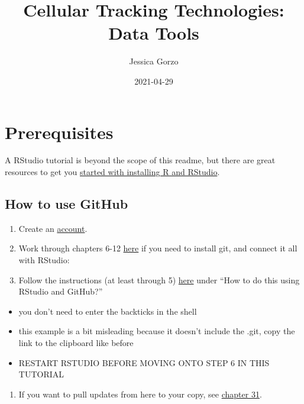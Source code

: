 \documentclass[
]{book}
\title{Cellular Tracking Technologies: Data Tools}
\author{Jessica Gorzo}
\date{2021-04-29}
\providecommand{\tightlist}{%
  \setlength{\itemsep}{0pt}\setlength{\parskip}{0pt}}
\begin{document}
\maketitle

{
\setcounter{tocdepth}{1}
\tableofcontents
}
\hypertarget{prerequisites}{%
\chapter{Prerequisites}\label{prerequisites}}

A RStudio tutorial is beyond the scope of this readme, but there are great resources to get you \href{https://www.earthdatascience.org/courses/earth-analytics/document-your-science/setup-r-rstudio/}{started with installing R and RStudio}.

\hypertarget{how-to-use-github}{%
\section{How to use GitHub}\label{how-to-use-github}}

\begin{enumerate}
\def\labelenumi{\arabic{enumi}.}
\tightlist
\item
  Create an \href{https://github.com}{account}.
\item
  Work through chapters 6-12 \href{https://happygitwithr.com/install-git.html}{here} if you need to install git, and connect it all with RStudio:
\item
  Follow the instructions (at least through 5) \href{https://r-bio.github.io/intro-git-rstudio/}{here} under ``How to do this using RStudio and GitHub?''
\end{enumerate}

\begin{itemize}
\tightlist
\item
  you don't need to enter the backticks in the shell
\item
  this example is a bit misleading because it doesn't include the .git, copy the link to the clipboard like before
\item
  RESTART RSTUDIO BEFORE MOVING ONTO STEP 6 IN THIS TUTORIAL
\end{itemize}

\begin{enumerate}
\def\labelenumi{\arabic{enumi}.}
\setcounter{enumi}{3}
\tightlist
\item
  If you want to pull updates from here to your copy, see \href{https://happygitwithr.com/upstream-changes.html\#pull-changes-from-upstream}{chapter 31}.
\end{enumerate}
\end{document}
